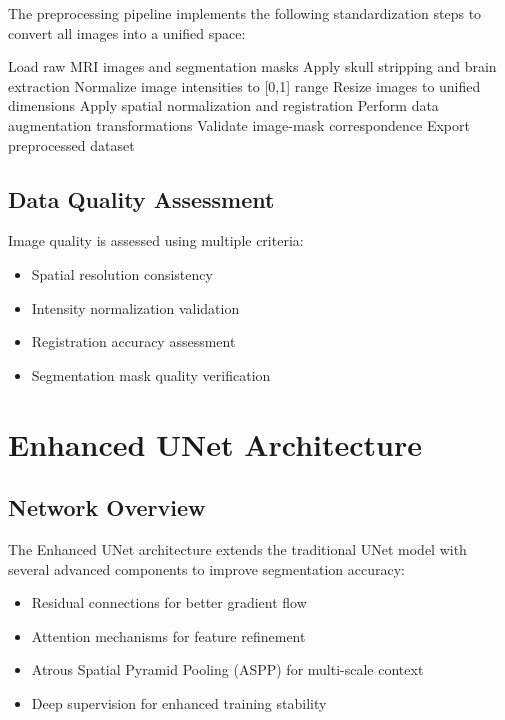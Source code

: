 The preprocessing pipeline implements the following standardization steps to convert all images into a unified space:

\begin{algorithm}[H]
\caption{Image Preprocessing Pipeline}
\begin{algorithmic}[1]
\STATE Load raw MRI images and segmentation masks
\STATE Apply skull stripping and brain extraction
\STATE Normalize image intensities to [0,1] range
\STATE Resize images to unified dimensions
\STATE Apply spatial normalization and registration
\STATE Perform data augmentation transformations
\STATE Validate image-mask correspondence
\STATE Export preprocessed dataset
\end{algorithmic}
\end{algorithm}

\subsection{Data Quality Assessment}

Image quality is assessed using multiple criteria:
\begin{itemize}
\item Spatial resolution consistency
\item Intensity normalization validation
\item Registration accuracy assessment
\item Segmentation mask quality verification
\end{itemize}

\section{Enhanced UNet Architecture}

\subsection{Network Overview}

The Enhanced UNet architecture extends the traditional UNet model with several advanced components to improve segmentation accuracy:

\begin{itemize}
\item Residual connections for better gradient flow
\item Attention mechanisms for feature refinement
\item Atrous Spatial Pyramid Pooling (ASPP) for multi-scale context
\item Deep supervision for enhanced training stability
\end{itemize}

